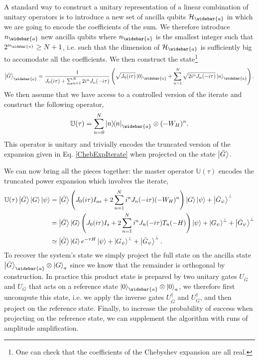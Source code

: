 \documentclass[a4paper,11pt]{article}
\begin{document}
A standard way to construct a unitary representation of a linear combination of unitary operators is to introduce a new set of ancilla qubits $\mathcal{H}_{\widebar{a}}$ in which we are going to encode the coefficients of the sum. We therefore introduce $n_{\widebar{a}}$ new ancilla qubits where $n_{\widebar{a}}$ is the smallest integer such that $2^{n_{\widebar{a}}} \geq N + 1$, i.e. such that the dimension of $\mathcal{H}_{\widebar{a}}$ is sufficiently big to accomodate all the coefficients. We then construct the state\footnote{One can check that the coefficients of the Chebyshev expansion are all real.}
\begin{equation}
    \ket{\bar{G}}_{\widebar{a}} = \frac{1}{J_0(i\tau)+\sum_{n = 1}^{N}2i^nJ_n(-i\tau)}\left(\sqrt{J_0(i\tau)}\ket{0}_{\widebar{a}}+ \sum_{n = 1}^{N}\sqrt{2i^nJ_n(-i\tau)}\ket{n}_{\widebar{a}}\right).
    \label{GbarState}
\end{equation}
We then assume that we have access to a controlled version of the iterate and construct the following operator,
\begin{equation}
    \mathbb{U}(\tau) =  \sum_{n = 0}^{N}\ketbra{n}{n}_{\widebar{a}}\otimes (-W_H)^n.
\end{equation}
This operator is unitary and trivially encodes the truncated version of the expansion given in Eq. \eqref{ChebExpIterate} when projected on the state $\ket{\bar{G}}$.

We can now bring all the pieces together: the master operator $\mathbb{U}(\tau)$ encodes the truncated power expansion which involves the iterate,
\begin{equation}
\begin{split}
    \mathbb{U}(\tau)\ket{\bar{G}}\ket{G}\ket{\psi} &= \ket{\bar{G}}\left(J_0(i\tau)I_{as}+2\sum_{n=1}^{N} i^n J_n(-i\tau)(-W_H)^n\right)\ket{G}\ket{\psi}+\ket{\bar{G}_\psi}^\perp\\
    &=\ket{\bar{G}}\ket{G}\left(J_0(i\tau)I_s+2\sum_{n=1}^{N} i^n J_n(-i\tau)T_n(-H)\right)\ket{\psi}+\ket{G_\psi}^\perp+\ket{\bar{G}_\psi}^\perp\\
    &\simeq\ket{\bar{G}}\ket{G}e^{-\tau H}\ket{\psi}+\ket{G_\psi}^\perp+\ket{\bar{G}_\psi}^\perp.
\end{split}
\end{equation}
To recover the system's state we simply project the full state on the ancilla state $\ket{\bar{G}}_{\widebar{a}}\otimes\ket{G}_a$ since we know that the remainder is orthogonal by construction. In practice this product state is prepared by two unitary gates $U_{\bar{G}}$ and $U_G$ that acts on a reference state $\ket{0}_{\widebar{a}}\otimes \ket{0}_a$, we therefore first uncompute this state, i.e. we apply the inverse gates $U^{\dagger}_{\bar{G}}$ and $U^{\dagger}_G$, and then project on the reference state. Finally, to increase the probability of success when projecting on the reference state, we can supplement the algorithm with runs of amplitude amplification. 
\end{document}
